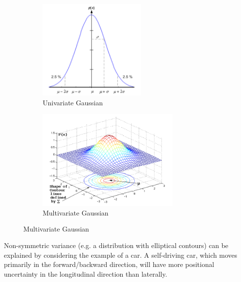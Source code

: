\documentclass[twoside]{article}
\begin{document}
\begin{figure}[h]
    \begin{subfigure}{0.5\textwidth}
        \includegraphics[width=0.9\linewidth, height=5cm]{scribe_1Dgauss} 
        \caption{Univariate Gaussian}
        \label{fig:1Dgauss}
    \end{subfigure}
    \begin{subfigure}{0.5\textwidth}
        \includegraphics[width=0.9\linewidth, height=5cm]{scribe_nDgauss}
        \caption{Multivariate Gaussian}
        \label{fig:NDgauss}
    \end{subfigure}
\end{figure}

Non-symmetric variance (e.g. a distribution with elliptical contours) can be explained by considering the example of a car. A self-driving car, which moves primarily in the forward/backward direction, will have more positional uncertainty in the longitudinal direction than laterally.
\end{document}
